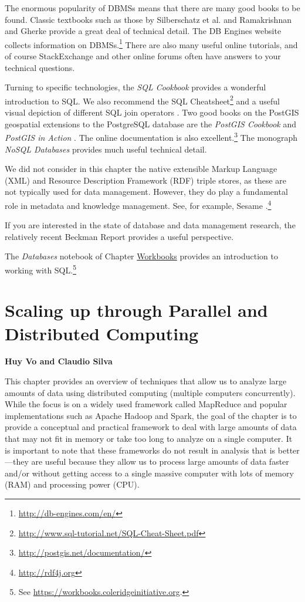 \documentclass[]{krantz}
\begin{document}
The enormous popularity of DBMSs means that there are many good books to
be found. Classic textbooks such as those by Silberschatz et al.
\citeyearpar{silberschatz2010database} and Ramakrishnan and Gherke
\citeyearpar{ramakrishnan2000database} provide a great deal of technical
detail. The DB Engines website collects information on DBMSs.\footnote{\url{http://db-engines.com/en/}}
There are also many useful online tutorials, and of course StackExchange
and other online forums often have answers to your technical questions.

Turning to specific technologies, the \emph{SQL Cookbook}
\citep{SQLCookbook} provides a wonderful introduction to SQL. We also
recommend the SQL Cheatsheet\footnote{\url{http://www.sql-tutorial.net/SQL-Cheat-Sheet.pdf}}
and a useful visual depiction of different SQL join operators
\citep{vizjoins}. Two good books on the PostGIS geospatial extensions to
the PostgreSQL database are the \emph{PostGIS Cookbook}
\citep{PostGISCookbook} and \emph{PostGIS in Action}
\citep{PostGISInAction}. The online documentation is also
excellent.\footnote{\url{http://postgis.net/documentation/}} The
monograph \emph{NoSQL Databases} \citep{NoSQLdatabases} provides much
useful technical detail.

We did not consider in this chapter the native extensible Markup
Language (XML) and Resource Description Framework (RDF) triple stores,
as these are not typically used for data management. However, they do
play a fundamental role in metadata and knowledge management. See, for
example, Sesame \citep{broekstra2002sesame}.\footnote{\url{http://rdf4j.org}}

If you are interested in the state of database and data management
research, the relatively recent Beckman Report \citep{abadi2014beckman}
provides a useful perspective.

The \emph{Databases} notebook of Chapter
\protect\hyperlink{chap:workbooks}{Workbooks} provides an introduction
to working with SQL.\footnote{See
  \url{https://workbooks.coleridgeinitiative.org}.}

\hypertarget{chap:parallel}{\chapter{Scaling up through Parallel and
Distributed Computing}\label{chap:parallel}}

\textbf{Huy Vo and Claudio Silva}

This chapter provides an overview of techniques that allow us to analyze
large amounts of data using distributed computing (multiple computers
concurrently). While the focus is on a widely used framework called
MapReduce and popular implementations such as Apache Hadoop and Spark,
the goal of the chapter is to provide a conceptual and practical
framework to deal with large amounts of data that may not fit in memory
or take too long to analyze on a single computer. It is important to
note that these frameworks do not result in analysis that is
better---they are useful because they allow us to process large amounts
of data faster and/or without getting access to a single massive
computer with lots of memory (RAM) and processing power (CPU).
\end{document}
